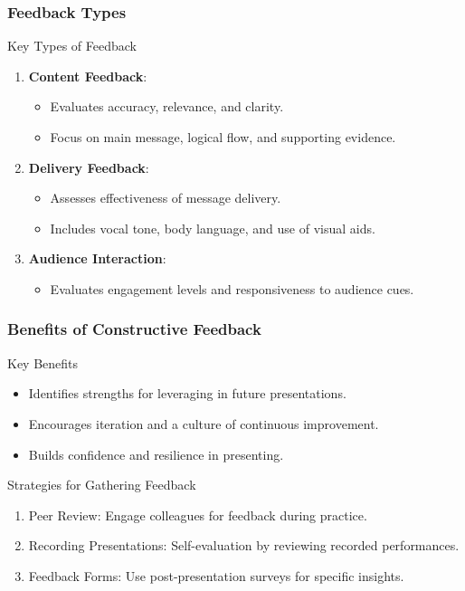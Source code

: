 \documentclass[aspectratio=169]{beamer}
\begin{document}
\begin{frame}[fragile]
    \frametitle{Feedback Types}
    \begin{block}{Key Types of Feedback}
        \begin{enumerate}
            \item \textbf{Content Feedback}:
            \begin{itemize}
                \item Evaluates accuracy, relevance, and clarity.
                \item Focus on main message, logical flow, and supporting evidence.
            \end{itemize}
            \item \textbf{Delivery Feedback}:
            \begin{itemize}
                \item Assesses effectiveness of message delivery.
                \item Includes vocal tone, body language, and use of visual aids.
            \end{itemize}
            \item \textbf{Audience Interaction}:
            \begin{itemize}
                \item Evaluates engagement levels and responsiveness to audience cues.
            \end{itemize}
        \end{enumerate}
    \end{block}
\end{frame}

\begin{frame}[fragile]
    \frametitle{Benefits of Constructive Feedback}
    \begin{block}{Key Benefits}
        \begin{itemize}
            \item Identifies strengths for leveraging in future presentations.
            \item Encourages iteration and a culture of continuous improvement.
            \item Builds confidence and resilience in presenting.
        \end{itemize}
    \end{block}

    \begin{block}{Strategies for Gathering Feedback}
        \begin{enumerate}
            \item Peer Review: Engage colleagues for feedback during practice.
            \item Recording Presentations: Self-evaluation by reviewing recorded performances.
            \item Feedback Forms: Use post-presentation surveys for specific insights.
        \end{enumerate}
    \end{block}
\end{frame}
\end{document}

